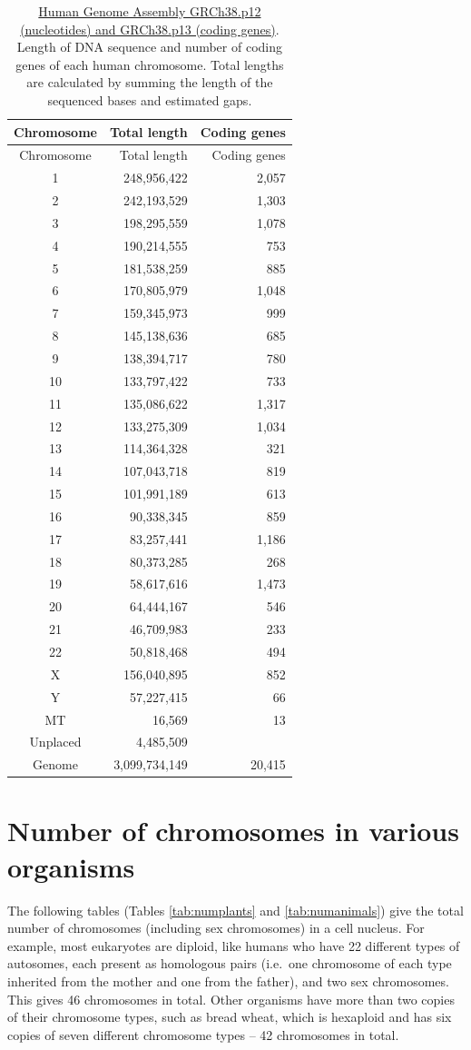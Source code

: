 \begin{longtable}[]{@{}crr@{}}
\caption{\label{tab:chr} \href{https://www.ncbi.nlm.nih.gov/grc/human/data}{Human Genome Assembly GRCh38.p12 (nucleotides) and GRCh38.p13 (coding genes)}. Length of DNA sequence and number of coding genes of each human chromosome. Total lengths are calculated by summing the length of the sequenced bases and estimated gaps.}\tabularnewline
\toprule
Chromosome & Total length & Coding genes\tabularnewline
\midrule
\endfirsthead
\toprule
Chromosome & Total length & Coding genes\tabularnewline
\midrule
\endhead
1 & 248,956,422 & 2,057\tabularnewline
2 & 242,193,529 & 1,303\tabularnewline
3 & 198,295,559 & 1,078\tabularnewline
4 & 190,214,555 & 753\tabularnewline
5 & 181,538,259 & 885\tabularnewline
6 & 170,805,979 & 1,048\tabularnewline
7 & 159,345,973 & 999\tabularnewline
8 & 145,138,636 & 685\tabularnewline
9 & 138,394,717 & 780\tabularnewline
10 & 133,797,422 & 733\tabularnewline
11 & 135,086,622 & 1,317\tabularnewline
12 & 133,275,309 & 1,034\tabularnewline
13 & 114,364,328 & 321\tabularnewline
14 & 107,043,718 & 819\tabularnewline
15 & 101,991,189 & 613\tabularnewline
16 & 90,338,345 & 859\tabularnewline
17 & 83,257,441 & 1,186\tabularnewline
18 & 80,373,285 & 268\tabularnewline
19 & 58,617,616 & 1,473\tabularnewline
20 & 64,444,167 & 546\tabularnewline
21 & 46,709,983 & 233\tabularnewline
22 & 50,818,468 & 494\tabularnewline
X & 156,040,895 & 852\tabularnewline
Y & 57,227,415 & 66\tabularnewline
MT & 16,569 & 13\tabularnewline
Unplaced & 4,485,509 &\tabularnewline
Genome & 3,099,734,149 & 20,415\tabularnewline
\bottomrule
\end{longtable}

\hypertarget{number-of-chromosomes-in-various-organisms}{%
\section{Number of chromosomes in various organisms}\label{number-of-chromosomes-in-various-organisms}}

The following tables (Tables \ref{tab:numplants} and \ref{tab:numanimals}) give the total number of chromosomes (including sex chromosomes) in a cell nucleus. For example, most eukaryotes are diploid, like humans who have 22 different types of autosomes, each present as homologous pairs (i.e.~one chromosome of each type inherited from the mother and one from the father), and two sex chromosomes. This gives 46 chromosomes in total. Other organisms have more than two copies of their chromosome types, such as bread wheat, which is hexaploid and has six copies of seven different chromosome types -- 42 chromosomes in total.

